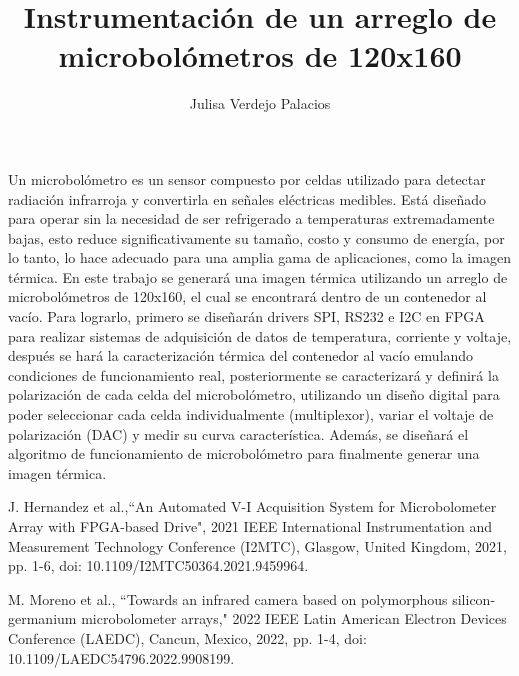 \documentclass[12pt,letterpaper]{article}
\author{Julisa Verdejo Palacios}
\title{Instrumentación de un arreglo de microbolómetros de 120x160}
\begin{document}
\maketitle


Un microbolómetro es un sensor compuesto por celdas utilizado para detectar radiación infrarroja y convertirla en señales eléctricas medibles. Está diseñado para operar sin la necesidad de ser refrigerado a temperaturas extremadamente bajas, esto reduce significativamente su tamaño, costo y consumo de energía, por lo tanto, lo hace adecuado para una amplia gama de aplicaciones, como la imagen térmica. 
En este trabajo se generará una imagen térmica utilizando un arreglo de microbolómetros de 120x160, el cual se encontrará dentro de un contenedor al vacío. Para lograrlo, primero se diseñarán drivers SPI, RS232 e I2C en FPGA para realizar sistemas de adquisición de datos de temperatura, corriente y voltaje, después se hará la caracterización térmica del contenedor al vacío emulando condiciones de funcionamiento real, posteriormente se caracterizará y definirá la polarización de cada celda del microbolómetro, utilizando un diseño digital para poder seleccionar cada celda individualmente (multiplexor), variar el voltaje de polarización (DAC) y medir su curva característica. Además, se diseñará el algoritmo de funcionamiento de microbolómetro para finalmente generar una imagen térmica.



\begin{thebibliography}{2}
 J. Hernandez et al.,``An Automated V-I Acquisition System for Microbolometer Array with FPGA-based Drive", 2021 IEEE International Instrumentation and Measurement Technology Conference (I2MTC), Glasgow, United Kingdom, 2021, pp. 1-6, doi: 10.1109/I2MTC50364.2021.9459964.

M. Moreno et al., ``Towards an infrared camera based on polymorphous silicon-germanium microbolometer arrays," 2022 IEEE Latin American Electron Devices Conference (LAEDC), Cancun, Mexico, 2022, pp. 1-4, doi: 10.1109/LAEDC54796.2022.9908199.
\end{thebibliography}
\end{document}
